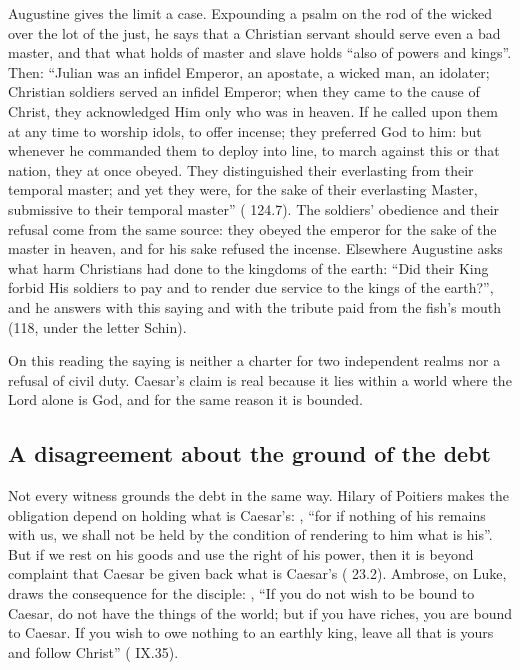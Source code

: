 Augustine gives the limit a case. Expounding a psalm on the rod of the wicked
over the lot of the just, he says that a Christian servant should serve even a
bad master, and that what holds of master and slave holds ``also of powers and
kings''. Then: ``Julian was an infidel Emperor, an apostate, a wicked man, an
idolater; Christian soldiers served an infidel Emperor; when they came to the
cause of Christ, they acknowledged Him only who was in heaven. If he called
upon them at any time to worship idols, to offer incense; they preferred God
to him: but whenever he commanded them to deploy into line, to march against
this or that nation, they at once obeyed. They distinguished their everlasting
from their temporal master; and yet they were, for the sake of their
everlasting Master, submissive to their temporal master'' ( 124.7). The soldiers' obedience and their refusal come from the
same source: they obeyed the emperor for the sake of the master in heaven, and
for his sake refused the incense. Elsewhere Augustine asks what harm
Christians had done to the kingdoms of the earth: ``Did their King forbid His
soldiers to pay and to render due service to the kings of the earth?'', and he
answers with this saying and with the tribute paid from the fish's mouth
(118, under the letter Schin).

On this reading the saying is neither a charter for two independent realms nor
a refusal of civil duty. Caesar's claim is real because it lies within a world
where the Lord alone is God, and for the same reason it is bounded.

\subsection{A disagreement about the ground of the debt}

Not every witness grounds the debt in the same way. Hilary of Poitiers makes the obligation depend on holding what is
Caesar's: , ``for if nothing of his remains with us, we shall
not be held by the condition of rendering to him what is his''. But if we rest
on his goods and use the right of his power, then it is beyond complaint that
Caesar be given back what is Caesar's ( 23.2).
Ambrose, on Luke, draws the consequence for the disciple: , ``If you do not wish to be bound to Caesar, do not have the
things of the world; but if you have riches, you are bound to Caesar. If you
wish to owe nothing to an earthly king, leave all that is yours and follow
Christ'' ( IX.35).


